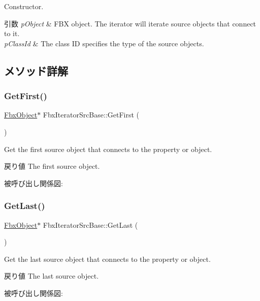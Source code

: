 Constructor. 
\begin{DoxyParams}{引数}
{\em p\+Object} & F\+BX object. The iterator will iterate source objects that connect to it. \\
\hline
{\em p\+Class\+Id} & The class ID specifies the type of the source objects. \\
\hline
\end{DoxyParams}


\subsection{メソッド詳解}
\mbox{\label{class_fbx_iterator_src_base_a19eea19f9f5fe3e94cc4a9fc626404c4}} 
\subsubsection{\texorpdfstring{Get\+First()}{GetFirst()}}
{\footnotesize\ttfamily \hyperlink{class_fbx_object}{Fbx\+Object}$\ast$ Fbx\+Iterator\+Src\+Base\+::\+Get\+First (\begin{DoxyParamCaption}{ }\end{DoxyParamCaption})}

Get the first source object that connects to the property or object. \begin{DoxyReturn}{戻り値}
The first source object. 
\end{DoxyReturn}
被呼び出し関係図\+:
\mbox{\label{class_fbx_iterator_src_base_a84d527f63d0b2953318bfcaac25b9b4a}} 
\subsubsection{\texorpdfstring{Get\+Last()}{GetLast()}}
{\footnotesize\ttfamily \hyperlink{class_fbx_object}{Fbx\+Object}$\ast$ Fbx\+Iterator\+Src\+Base\+::\+Get\+Last (\begin{DoxyParamCaption}{ }\end{DoxyParamCaption})}

Get the last source object that connects to the property or object. \begin{DoxyReturn}{戻り値}
The last source object. 
\end{DoxyReturn}
被呼び出し関係図\+:
\mbox{\label{class_fbx_iterator_src_base_a640019fa81262dd57ac07bba9efc47e6}} 
